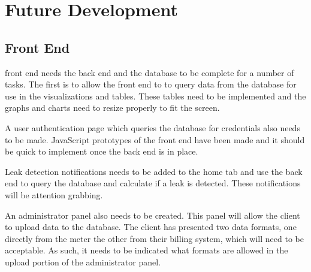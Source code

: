 \documentclass[journal]{IEEEtran}
\begin{document}

%


\section{Future Development}
\subsection{Front End}
 front end needs the back end and the database to be complete for a number of tasks. The first is to allow the front end to to query data from the database for use in the visualizations and tables. These tables need to be implemented and the graphs and charts need to resize properly to fit the screen.

A user authentication page which queries the database for credentials also needs to be made. JavaScript prototypes of the front end have been made and it should be quick to implement once the back end is in place.

Leak detection notifications needs to be added to the home tab and use the back end to query the database and calculate if a leak is detected. These notifications will be attention grabbing.

An administrator panel also needs to be created. This panel will allow the client to upload data to the database. The client has presented two data formats, one directly from the meter the other from their billing system, which will need to be acceptable. As such, it needs to be indicated what formats are allowed in the upload portion of the administrator panel.
\end{document}
